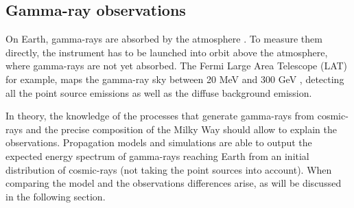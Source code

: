 

\subsection{Gamma-ray observations}

On Earth, gamma-rays are absorbed by the atmosphere \cite{HSU}. To measure them directly, the instrument has to be launched into orbit above the atmosphere, where gamma-rays are not yet absorbed. The Fermi Large Area Telescope (LAT) for example, maps the gamma-ray sky between 20 MeV and 300 GeV \cite{Fermi2009}, detecting all the point source emissions as well as the diffuse background emission.




In theory, the knowledge of the processes that generate gamma-rays from cosmic-rays and the precise composition of the Milky Way should allow to explain the observations. Propagation models and simulations are able to output the expected energy spectrum of gamma-rays reaching Earth from an initial distribution of cosmic-rays (not taking the point sources into account). When comparing the model and the observations differences arise, as will be discussed in the following section.


\newpage
